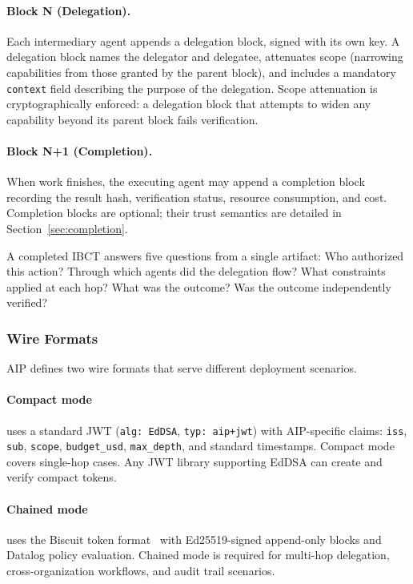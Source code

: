 \documentclass[11pt,a4paper]{article}
\newcommand{\aip}{\textsc{AIP}}
\newcommand{\ibct}{\textsc{IBCT}}
\begin{document}
\paragraph{Block N (Delegation).} Each intermediary agent appends a delegation block, signed with its own key. A delegation block names the delegator and delegatee, attenuates scope (narrowing capabilities from those granted by the parent block), and includes a mandatory \texttt{context} field describing the purpose of the delegation. Scope attenuation is cryptographically enforced: a delegation block that attempts to widen any capability beyond its parent block fails verification.

\paragraph{Block N+1 (Completion).} When work finishes, the executing agent may append a completion block recording the result hash, verification status, resource consumption, and cost. Completion blocks are optional; their trust semantics are detailed in Section~\ref{sec:completion}.

A completed \ibct{} answers five questions from a single artifact: Who authorized this action? Through which agents did the delegation flow? What constraints applied at each hop? What was the outcome? Was the outcome independently verified?

\subsubsection{Wire Formats}

\aip{} defines two wire formats that serve different deployment scenarios.

\paragraph{Compact mode} uses a standard JWT (\texttt{alg: EdDSA}, \texttt{typ: aip+jwt}) with \aip{}-specific claims: \texttt{iss}, \texttt{sub}, \texttt{scope}, \texttt{budget\_usd}, \texttt{max\_depth}, and standard timestamps. Compact mode covers single-hop cases. Any JWT library supporting EdDSA can create and verify compact tokens.

\paragraph{Chained mode} uses the Biscuit token format~\citep{biscuit2024spec} with Ed25519-signed append-only blocks and Datalog policy evaluation. Chained mode is required for multi-hop delegation, cross-organization workflows, and audit trail scenarios.
\end{document}
